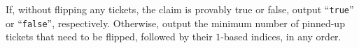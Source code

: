 
    If, without flipping any tickets, the claim is provably true or false, output ``\texttt{true}'' or ``\texttt{false}'', respectively.
    Otherwise, output the minimum number of pinned-up tickets that need to be flipped, followed by their $1$-based indices, in any order.
